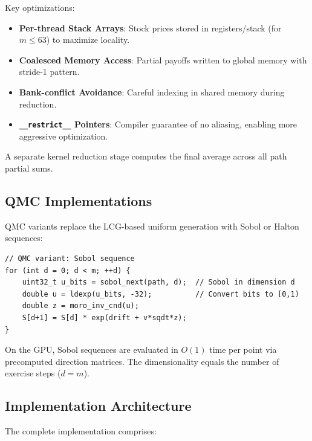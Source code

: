 \documentclass[11pt,a4paper]{article}
\begin{document}
Key optimizations:

\begin{itemize}
    \item \textbf{Per-thread Stack Arrays}: Stock prices stored in registers/stack (for $m \le 63$) to maximize locality.
    \item \textbf{Coalesced Memory Access}: Partial payoffs written to global memory with stride-1 pattern.
    \item \textbf{Bank-conflict Avoidance}: Careful indexing in shared memory during reduction.
    \item \textbf{{\tt \_\_restrict\_\_} Pointers}: Compiler guarantee of no aliasing, enabling more aggressive optimization.
\end{itemize}

A separate kernel reduction stage computes the final average across all path partial sums.

\subsection{QMC Implementations}

QMC variants replace the LCG-based uniform generation with Sobol or Halton sequences:

\begin{lstlisting}
// QMC variant: Sobol sequence
for (int d = 0; d < m; ++d) {
    uint32_t u_bits = sobol_next(path, d);  // Sobol in dimension d
    double u = ldexp(u_bits, -32);          // Convert bits to [0,1)
    double z = moro_inv_cnd(u);
    S[d+1] = S[d] * exp(drift + v*sqdt*z);
}
\end{lstlisting}

On the GPU, Sobol sequences are evaluated in $O(1)$ time per point via precomputed direction matrices. The dimensionality equals the number of exercise steps ($d = m$).

\subsection{Implementation Architecture}

The complete implementation comprises:
\end{document}
